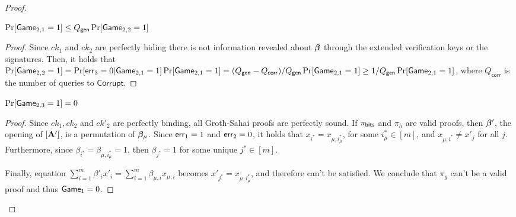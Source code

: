 \begin{proof}
\begin{lemma} $\Pr[\mathsf{Game}_{2,1}=1] \leq Q_\mathsf{gen}\Pr[\mathsf{Game}_{2,2}=1]$
\end{lemma}
\begin{proof}
Since $ck_1$ and $ck_2$ are perfectly hiding there is not information revealed about ${\boldsymbol{\beta}}$ through the extended verification keys or the signatures. Then, it holds that $\Pr[\mathsf{Game}_{2,2}=1] = \Pr[\mathsf{err}_3=0|\mathsf{Game}_{2,1}=1]\Pr[\mathsf{Game}_{2,1}=1] =(Q_\mathsf{gen} - Q_\mathsf{corr})/Q_\mathsf{gen}\Pr[\mathsf{Game}_{2,1}=1] \geq 1/Q_{\mathsf{gen}}\Pr[\mathsf{Game}_{2,1}=1]$, where $Q_\mathsf{corr}$ is the number of queries to $\mathsf{Corrupt}$.
\end{proof}

\begin{lemma}
$\Pr[\mathsf{Game}_{2,3}=1] = 0$
\end{lemma}
\begin{proof}
Since $ck_1,ck_2$ and $ck'_2$ are perfectly binding, all Groth-Sahai proofs are perfectly sound. If $\pi_{\mathsf{bits}}$ and $\pi_h$  are valid proofs, then ${\boldsymbol{\beta}}'$, the opening of $[\mathbf{{A}}']$, is a permutation of ${\boldsymbol{\beta}}_\mu$. Since $\mathsf{err}_1 = 1$ and $\mathsf{err}_2 = 0$, it holds that $x_{i^*} = x_{\mu, i^*_\mu}$, for some $i^*_\mu\in[m]$, and $x_{\mu,i^*}\neq x'_j$ for all $j$. Furthermore, since $\beta_{i^*} = \beta_{\mu,i^*_\mu}=1$, then $\beta_{j^*}=1$ for some unique $j^*\in[m]$.

Finally, equation $\sum_{i=1}^m\beta'_i x'_i = \sum_{i=1}^m \beta_{\mu,i}x_{\mu,i}$ becomes $x'_{j^*} = x_{\mu,i^*_\mu}$, and therefore can't be satisfied. We conclude that $\pi_g$ can't be a valid proof and thus $\mathsf{Game}_1 = 0$.
\end{proof}


\end{proof}
